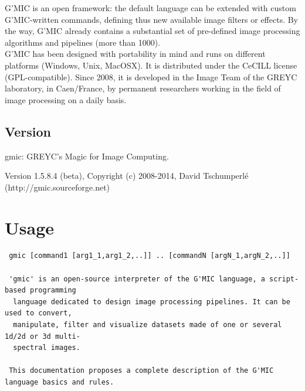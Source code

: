 \documentclass[a4paper,11pt,twoside]{book}
\begin{document}
G'MIC is an open framework: the default language can be extended with custom G'MIC-written commands, defining thus new available image filters or effects. By the way, G'MIC already contains a substantial set of pre-defined image processing algorithms and pipelines (more than 1000).\\ 
 
G'MIC has been designed with portability in mind and runs on different platforms (Windows, Unix, MacOSX). It is distributed under the CeCILL license (GPL-compatible). Since 2008, it is developed in the Image Team of the GREYC laboratory, in Caen/France, by permanent researchers working in the field of image processing on a daily basis. 
\section*{Version} 
 
 gmic: GREYC's Magic for Image Computing. 
 
        Version 1.5.8.4 (beta), Copyright (c) 2008-2014, David Tschumperl\'e 
        (http://gmic.sourceforge.net) 
\chapter{Usage} 
\small
\begin{lstlisting}
 gmic [command1 [arg1_1,arg1_2,..]] .. [commandN [argN_1,argN_2,..]] 
 
 'gmic' is an open-source interpreter of the G'MIC language, a script-based programming 
  language dedicated to design image processing pipelines. It can be used to convert, 
  manipulate, filter and visualize datasets made of one or several 1d/2d or 3d multi- 
  spectral images. 
 
 This documentation proposes a complete description of the G'MIC language basics and rules.
\end{lstlisting}
\normalsize
\end{document}
